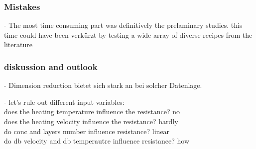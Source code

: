 \subsubsection{Mistakes} 
- The most time consuming part was definitively the prelaminary studies.
this time could have been verkürzt by testing a wide array of diverse recipes from the literature

\subsubsection{diskussion and outlook}
- Dimension reduction bietet sich stark an bei solcher Datenlage. 



- let's rule out different input variables: \\
does the heating temperature influence the resistance?  no \\
does the heating velocity influence the resistance?  hardly\\
do conc and layers number influence resistance? linear \\
do db velocity and db temperautre influence resistance? how\\

